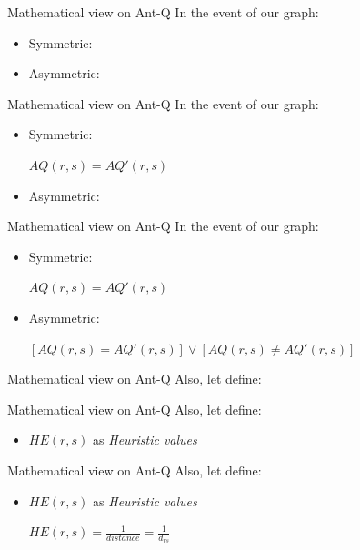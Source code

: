 \documentclass[aspectratio=169,xcolor=dvipsnames]{beamer}
\begin{document}
\begin{frame}{Mathematical view on Ant-Q}
    In the event of our graph:
    \begin{itemize}
        \item Symmetric:
        \item Asymmetric:
    \end{itemize}    
\end{frame}

\begin{frame}{Mathematical view on Ant-Q}
    In the event of our graph:
    \begin{itemize}
        \item Symmetric:
        \begin{center}
            $AQ(r, s) = AQ'(r, s)$
        \end{center}
        \item Asymmetric:
    \end{itemize}    
\end{frame}

\begin{frame}{Mathematical view on Ant-Q}
    In the event of our graph:
    \begin{itemize}
        \item Symmetric:
        \begin{center}
            $AQ(r, s) = AQ'(r, s)$
        \end{center}
        \item Asymmetric:
        \begin{center}
            $\left[AQ(r, s) = AQ'(r, s)\right] \lor \left[AQ(r, s) \neq AQ'(r, s)\right]$
            
        \end{center}
    \end{itemize}    
\end{frame}

\begin{frame}{Mathematical view on Ant-Q}
    Also, let define:
\end{frame}

\begin{frame}{Mathematical view on Ant-Q}
    Also, let define:
    \begin{itemize}
        \item $HE(r, s)$ as \textit{Heuristic values}
    \end{itemize}
\end{frame}

\begin{frame}{Mathematical view on Ant-Q}
    Also, let define:
    \begin{itemize}
        \item $HE(r, s)$ as \textit{Heuristic values}
        \begin{center}
            $HE(r, s) = \frac{1}{distance} = \frac{1}{d_{rs}}$
        \end{center}
    \end{itemize}
\end{frame}
\end{document}
